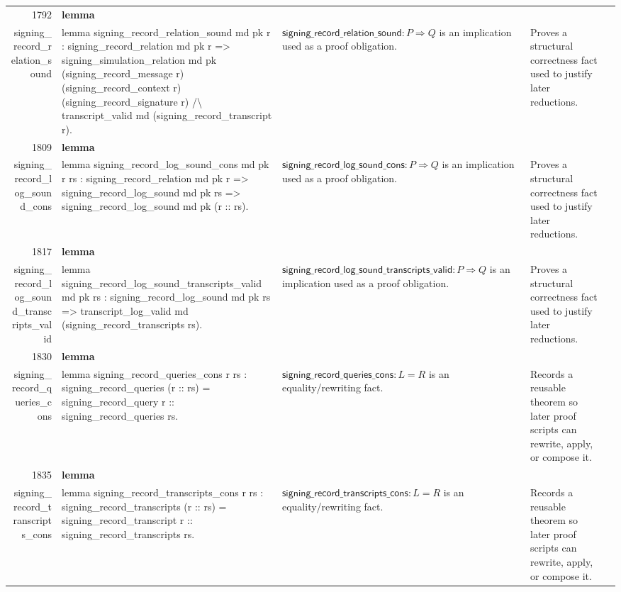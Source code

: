 \documentclass[10pt]{article}
\newcommand{\ec}[1]{\begingroup\ttfamily\scriptsize #1\endgroup}
\begin{document}
\begin{longtable}{r L{0.17\textwidth} L{0.26\textwidth} L{0.27\textwidth} L{0.20\textwidth}}
1792 & \textbf{lemma}\\\ec{signing\_record\_relation\_sound} & \ec{lemma signing\_record\_relation\_sound md pk r : signing\_record\_relation md pk r => signing\_simulation\_relation md pk (signing\_record\_message r) (signing\_record\_context r) (signing\_record\_signature r) /\textbackslash{} transcript\_valid md (signing\_record\_transcript r).} & \(\mathsf{signing\_record\_relation\_sound} : P \Rightarrow Q\) is an implication used as a proof obligation. & Proves a structural correctness fact used to justify later reductions. \\
1809 & \textbf{lemma}\\\ec{signing\_record\_log\_sound\_cons} & \ec{lemma signing\_record\_log\_sound\_cons md pk r rs : signing\_record\_relation md pk r => signing\_record\_log\_sound md pk rs => signing\_record\_log\_sound md pk (r :: rs).} & \(\mathsf{signing\_record\_log\_sound\_cons} : P \Rightarrow Q\) is an implication used as a proof obligation. & Proves a structural correctness fact used to justify later reductions. \\
1817 & \textbf{lemma}\\\ec{signing\_record\_log\_sound\_transcripts\_valid} & \ec{lemma signing\_record\_log\_sound\_transcripts\_valid md pk rs : signing\_record\_log\_sound md pk rs => transcript\_log\_valid md (signing\_record\_transcripts rs).} & \(\mathsf{signing\_record\_log\_sound\_transcripts\_valid} : P \Rightarrow Q\) is an implication used as a proof obligation. & Proves a structural correctness fact used to justify later reductions. \\
1830 & \textbf{lemma}\\\ec{signing\_record\_queries\_cons} & \ec{lemma signing\_record\_queries\_cons r rs : signing\_record\_queries (r :: rs) = signing\_record\_query r :: signing\_record\_queries rs.} & \(\mathsf{signing\_record\_queries\_cons} : L = R\) is an equality/rewriting fact. & Records a reusable theorem so later proof scripts can rewrite, apply, or compose it. \\
1835 & \textbf{lemma}\\\ec{signing\_record\_transcripts\_cons} & \ec{lemma signing\_record\_transcripts\_cons r rs : signing\_record\_transcripts (r :: rs) = signing\_record\_transcript r :: signing\_record\_transcripts rs.} & \(\mathsf{signing\_record\_transcripts\_cons} : L = R\) is an equality/rewriting fact. & Records a reusable theorem so later proof scripts can rewrite, apply, or compose it. \\

\end{longtable}
\end{document}
